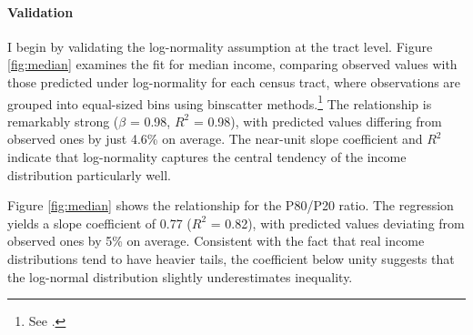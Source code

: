 
\paragraph{Validation} I begin by validating the log-normality assumption at the tract level. Figure \ref{fig:median} examines the fit for median income, comparing observed values with those predicted under log-normality for each census tract, where observations are grouped into equal-sized bins using binscatter methods.\footnote{See \cite{cattaneo}.} The relationship is remarkably strong ($\beta$ = 0.98, $R^2$ = 0.98), with predicted values differing from observed ones by just 4.6\% on average. The near-unit slope coefficient and $R^2$ indicate that log-normality captures the central tendency of the income distribution particularly well.

Figure \ref{fig:median} shows the relationship for the P80/P20 ratio. The regression yields a slope coefficient of 0.77 ($R^2$ = 0.82), with predicted values deviating from observed ones by 5\% on average. Consistent with the fact that real income distributions tend to have heavier tails, the coefficient below unity suggests that the log-normal distribution slightly underestimates inequality.


